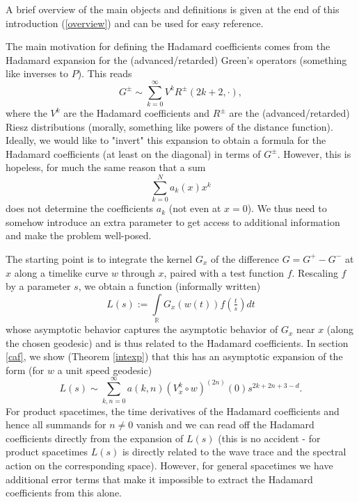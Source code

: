 \documentclass[11pt]{article}
\def\R{{\mathbb{R}}}
\def\insum#1{\sum\limits_{#1=0}^\infty}
\def\intR{\int\limits_\R}
\begin{document}
A brief overview of the main objects and definitions is given at the end of this introduction (\ref{overview}) and can be used for easy reference. 

The main motivation for defining the Hadamard coefficients comes from the Hadamard expansion for the (advanced/retarded) Green's operators (something like inverses to $P$). This reads
\[G^\pm\sim \insum{k}V^kR^\pm (2k+2,\cdot),\]
where the $V^k$ are the Hadamard coefficients and $R^\pm$ are the (advanced/retarded) Riesz distributions (morally, something like powers of the distance function). Ideally, we would like to "invert" this expansion to obtain a formula for the Hadamard coefficients (at least on the diagonal) in terms of $G^\pm$. However, this is hopeless, for much the same reason that a sum
\[\sum\limits_{k=0}^Na_k(x) x^k\]
does not determine the coefficients $a_k$ (not even at $x=0$). We thus need to somehow introduce an extra parameter to get access to additional information and make the problem well-posed.

The starting point is to integrate the kernel $G_x$ of the difference $G=G^+-G^-$ at $x$ along a timelike curve $w$ through $x$, paired with a test function $f$. Rescaling $f$ by a parameter $s$, we obtain a function (informally written)
\begin{equation}
	\label{dfl}
	L(s):=\intR G_x(w(t))f(\tfrac{t}{s})dt
\end{equation}
whose asymptotic behavior captures the asymptotic behavior of $G_x$ near $x$ (along the chosen geodesic) and is thus related to the Hadamard coefficients. In section \ref{caf}, we show (Theorem \ref{intexp}) that this has an asymptotic expansion of the form (for $w$ a unit speed geodesic)
\[L(s)\sim\sum\limits_{k,n=0}^\infty a(k,n)(V_x^k\circ w)^{(2n)}(0)s^{2k+2n+3-d}.\]
For product spacetimes, the time derivatives of the Hadamard coefficients and hence all summands for $n\neq 0$ vanish and we can read off the Hadamard coefficients directly from the expansion of $L(s)$ (this is no accident - for product spacetimes $L(s)$ is directly related to the wave trace and the spectral action on the corresponding space). However, for general spacetimes we have additional error terms that make it impossible to extract the Hadamard coefficients from this alone.
\end{document}
